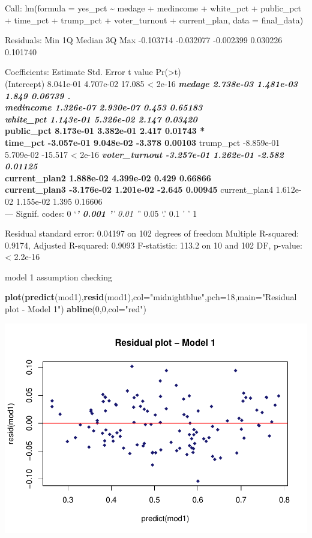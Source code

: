 \documentclass[
]{article}
\newenvironment{Shaded}{\begin{snugshade}}{\end{snugshade}}
\newcommand{\DataTypeTok}[1]{\textcolor[rgb]{0.13,0.29,0.53}{#1}}
\newcommand{\DecValTok}[1]{\textcolor[rgb]{0.00,0.00,0.81}{#1}}
\newcommand{\KeywordTok}[1]{\textcolor[rgb]{0.13,0.29,0.53}{\textbf{#1}}}
\newcommand{\NormalTok}[1]{#1}
\newcommand{\StringTok}[1]{\textcolor[rgb]{0.31,0.60,0.02}{#1}}
\begin{document}
Call: lm(formula = yes\_pct \textasciitilde{} medage + medincome +
white\_pct + public\_pct + time\_pct + trump\_pct + voter\_turnout +
current\_plan, data = final\_data)

Residuals: Min 1Q Median 3Q Max -0.103714 -0.032077 -0.002399 0.030226
0.101740

Coefficients: Estimate Std. Error t value
Pr(\textgreater\textbar t\textbar)\\
(Intercept) 8.041e-01 4.707e-02 17.085 \textless{} 2e-16 \textbf{\emph{
medage 2.738e-03 1.481e-03 1.849 0.06739 .\\
medincome 1.326e-07 2.930e-07 0.453 0.65183\\
white\_pct 1.143e-01 5.326e-02 2.147 0.03420 }\\
public\_pct 8.173e-01 3.382e-01 2.417 0.01743 *\\
time\_pct -3.057e-01 9.048e-02 -3.378 0.00103 } trump\_pct -8.859e-01
5.709e-02 -15.517 \textless{} 2e-16 \textbf{\emph{ voter\_turnout
-3.257e-01 1.262e-01 -2.582 0.01125 }\\
current\_plan2 1.888e-02 4.399e-02 0.429 0.66866\\
current\_plan3 -3.176e-02 1.201e-02 -2.645 0.00945 } current\_plan4
1.612e-02 1.155e-02 1.395 0.16606\\
--- Signif. codes: 0 `\emph{\textbf{' 0.001 '}' 0.01 '}' 0.05 `.' 0.1 '
' 1

Residual standard error: 0.04197 on 102 degrees of freedom Multiple
R-squared: 0.9174, Adjusted R-squared: 0.9093 F-statistic: 113.2 on 10
and 102 DF, p-value: \textless{} 2.2e-16

model 1 assumption checking

\begin{Shaded}
\begin{Highlighting}[]
\KeywordTok{plot}\NormalTok{(}\KeywordTok{predict}\NormalTok{(mod1),}\KeywordTok{resid}\NormalTok{(mod1),}\DataTypeTok{col=}\StringTok{"midnightblue"}\NormalTok{,}\DataTypeTok{pch=}\DecValTok{18}\NormalTok{,}\DataTypeTok{main=}\StringTok{"Residual plot - Model 1"}\NormalTok{)}
\KeywordTok{abline}\NormalTok{(}\DecValTok{0}\NormalTok{,}\DecValTok{0}\NormalTok{,}\DataTypeTok{col=}\StringTok{"red"}\NormalTok{)}
\end{Highlighting}
\end{Shaded}

\includegraphics{Zhong_paper_files/figure-latex/unnamed-chunk-5-1.pdf}
\end{document}
